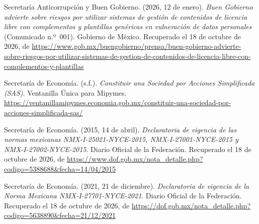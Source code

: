 \documentclass[12pt, a4paper]{article}
\begin{document}
\begin{list}{}{\setlength{\leftmargin}{1.27cm}\setlength{\itemindent}{-1.27cm}%
  \setlength{\labelwidth}{0pt}\setlength{\labelsep}{0pt}\setlength{\itemsep}{6pt}}
\item Secretaría Anticorrupción y Buen Gobierno. (2026, 12 de enero).
  \textit{Buen Gobierno advierte sobre riesgos por utilizar sistemas de
  gestión de contenidos de licencia libre con complementos y plantillas
  genéricas en vulneración de datos personales} (Comunicado n.º~001).
  Gobierno de México. Recuperado el 18 de octubre de 2026, de \url{https://www.gob.mx/buengobierno/prensa/buen-gobierno-advierte-sobre-riesgos-por-utilizar-sistemas-de-gestion-de-contenidos-de-licencia-libre-con-complementos-y-plantillas}
 
 
\item Secretaría de Economía. (s.f.). \textit{Constituir una Sociedad por
  Acciones Simplificada (SAS)}. Ventanilla Única para Mipymes.
  \url{https://ventanillamipymes.economia.gob.mx/constituir-una-sociedad-por-acciones-simplificada-sas/}
 

\item Secretaría de Economía. (2015, 14 de abril). \textit{Declaratoria
  de vigencia de las normas mexicanas NMX-I-25021-NYCE-2015,
  NMX-I-27001-NYCE-2015 y NMX-I-27002-NYCE-2015}. Diario Oficial de
  la Federación.
  Recuperado el 18 de octubre de 2026, de \url{https://www.dof.gob.mx/nota_detalle.php?codigo=5388688&fecha=14/04/2015}
 
 
\item Secretaría de Economía. (2021, 21 de diciembre).
  \textit{Declaratoria de vigencia de la Norma Mexicana
  NMX-I-27701-NYCE-2021}. Diario Oficial de la Federación.
  Recuperado el 18 de octubre de 2026, de \url{https://dof.gob.mx/nota_detalle.php?codigo=5638890&fecha=21/12/2021}
 

\end{list}
\end{document}
